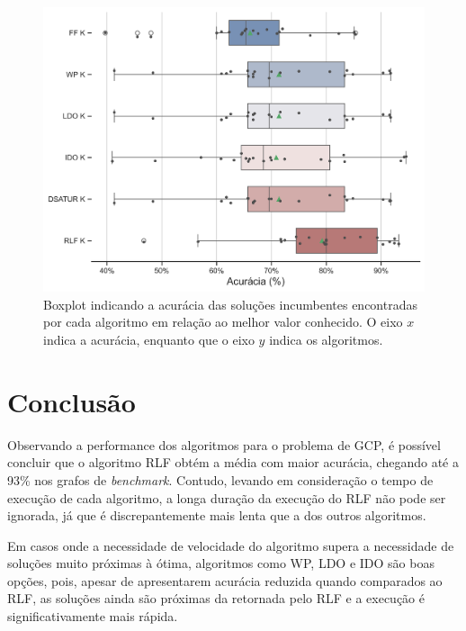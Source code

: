 \documentclass[10pt, twocolumn]{article}
\begin{document}
\begin{figure}[H]
  \centering
  \includegraphics[scale=0.37]{img/boxplot.png}
  \caption{Boxplot indicando a acurácia das soluções incumbentes encontradas por
  cada algoritmo em relação ao melhor valor conhecido.
  O eixo $x$ indica a acurácia, enquanto que o eixo $y$ indica os algoritmos.
  }
  \label{fig:boxplot}
\end{figure}


\section{Conclusão}
Observando a performance dos algoritmos para o problema de GCP, é possível concluir
que o algoritmo RLF obtém a média com maior acurácia, chegando até a 93\% nos
grafos de \emph{benchmark}. Contudo, levando em consideração o tempo de execução
de cada algoritmo, a longa duração da execução do RLF não pode ser ignorada,
já que é discrepantemente mais lenta que a dos outros algoritmos.

Em casos onde a necessidade de velocidade do algoritmo supera a necessidade de 
soluções muito próximas à ótima, algoritmos como WP, LDO e IDO são boas opções,
pois, apesar de apresentarem acurácia reduzida quando comparados ao RLF,
as soluções ainda são próximas da retornada pelo RLF e a execução é significativamente
mais rápida.





\end{document}
